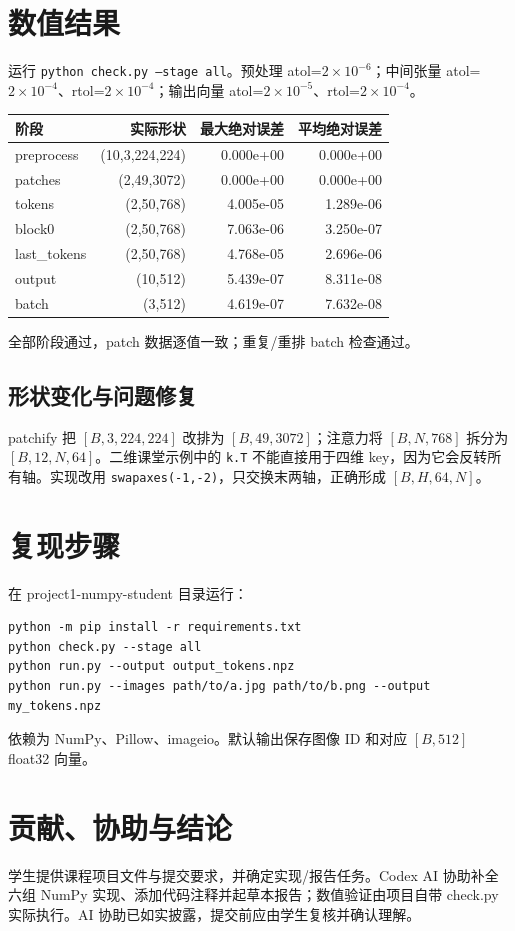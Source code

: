 \documentclass[UTF8,12pt,a4paper]{ctexart}
\begin{document}
\section{数值结果}
运行 \texttt{python check.py --stage all}。预处理 atol=$2\times10^{-6}$；中间张量 atol=$2\times10^{-4}$、rtol=$2\times10^{-4}$；输出向量 atol=$2\times10^{-5}$、rtol=$2\times10^{-4}$。
\begin{center}\small
\begin{tabular}{lrrr}\toprule
阶段 & 实际形状 & 最大绝对误差 & 平均绝对误差\\\midrule
preprocess &(10,3,224,224)&0.000e+00&0.000e+00\\
patches &(2,49,3072)&0.000e+00&0.000e+00\\
tokens &(2,50,768)&4.005e-05&1.289e-06\\
block0 &(2,50,768)&7.063e-06&3.250e-07\\
last\_tokens &(2,50,768)&4.768e-05&2.696e-06\\
output &(10,512)&5.439e-07&8.311e-08\\
batch &(3,512)&4.619e-07&7.632e-08\\\bottomrule
\end{tabular}\end{center}
全部阶段通过，patch 数据逐值一致；重复/重排 batch 检查通过。

\subsection{形状变化与问题修复}
patchify 把 $[B,3,224,224]$ 改排为 $[B,49,3072]$；注意力将 $[B,N,768]$ 拆分为 $[B,12,N,64]$。二维课堂示例中的 \texttt{k.T} 不能直接用于四维 key，因为它会反转所有轴。实现改用 \texttt{swapaxes(-1,-2)}，只交换末两轴，正确形成 $[B,H,64,N]$。

\section{复现步骤}
在 project1-numpy-student 目录运行：
\begin{verbatim}
python -m pip install -r requirements.txt
python check.py --stage all
python run.py --output output_tokens.npz
python run.py --images path/to/a.jpg path/to/b.png --output my_tokens.npz
\end{verbatim}
依赖为 NumPy、Pillow、imageio。默认输出保存图像 ID 和对应 $[B,512]$ float32 向量。

\section{贡献、协助与结论}
学生提供课程项目文件与提交要求，并确定实现/报告任务。Codex AI 协助补全六组 NumPy 实现、添加代码注释并起草本报告；数值验证由项目自带 check.py 实际执行。AI 协助已如实披露，提交前应由学生复核并确认理解。
\end{document}
